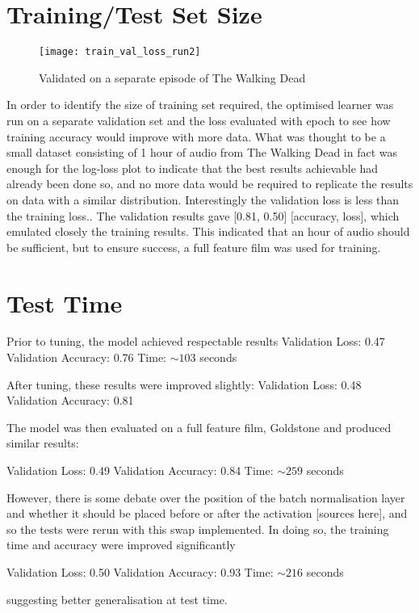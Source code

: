 \section{Training/Test Set Size}
\begin{wrapfigure}{l}{0.3\textwidth} 
	\texttt{[image: train\_val\_loss\_run2]}
	\caption{Validated on a separate episode of The Walking Dead}
	\label{val_loss}
\end{wrapfigure}
In order to identify the size of training set required, the optimised learner was run on a separate validation set and the loss evaluated with epoch to see how training accuracy would improve with more data. What was thought to be a small dataset consisting of 1 hour of audio from The Walking Dead in fact was enough for the log-loss plot to indicate that the best results achievable had already been done so, and no more data would be required to replicate the results on data with a similar distribution.
Interestingly the validation loss is less than the training loss..
The validation results gave [0.81, 0.50] [accuracy, loss], which emulated closely the training results. This indicated that an hour of audio should be sufficient, but to ensure success, a full feature film was used for training.

\section{Test Time}
Prior to tuning, the model achieved respectable results Validation Loss: 0.47
Validation Accuracy: 0.76
Time:  $\sim103$ seconds

After tuning, these results were improved slightly:
Validation Loss: 0.48
Validation Accuracy: 0.81

The model was then evaluated on a full feature film, Goldstone and produced similar results:

Validation Loss: 0.49
Validation Accuracy: 0.84
Time: $\sim259$ seconds

However, there is some debate over the position of the batch normalisation layer and whether it should be placed before or after the activation [sources here], and so the tests were rerun with this swap implemented. 
In doing so, the training time and accuracy were improved significantly

Validation Loss: 0.50
Validation Accuracy: 0.93
Time: $\sim216$ seconds

suggesting better generalisation at test time.
